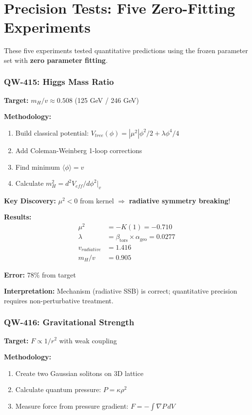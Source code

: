\documentclass[11pt,a4paper]{book}
\theoremstyle{remark}
\newcommand{\alphageo}{\alpha_{\text{geo}}}
\newcommand{\betators}{\beta_{\text{tors}}}
\begin{document}
\part{Precision Tests: Five Zero-Fitting Experiments}

These five experiments tested quantitative predictions using the frozen parameter set with \textbf{zero parameter fitting}.

\section{QW-415: Higgs Mass Ratio}

\textbf{Target:} $m_H/v \approx 0.508$ (125 GeV / 246 GeV)

\textbf{Methodology:}
\begin{enumerate}
    \item Build classical potential: $V_{tree}(\phi) = |\mu^2|\phi^2/2 + \lambda\phi^4/4$
    \item Add Coleman-Weinberg 1-loop corrections
    \item Find minimum $\langle\phi\rangle = v$
    \item Calculate $m_H^2 = d^2V_{eff}/d\phi^2|_v$
\end{enumerate}

\textbf{Key Discovery:} $\mu^2 < 0$ from kernel $\Rightarrow$ \textbf{radiative symmetry breaking}!

\textbf{Results:}
\begin{align}
\mu^2 &= -K(1) = -0.710 \\
\lambda &= \betators \times \alphageo = 0.0277 \\
v_{radiative} &= 1.416 \\
m_H/v &= \mathbf{0.905}
\end{align}

\textbf{Error:} 78\% from target

\textbf{Interpretation:} Mechanism (radiative SSB) is correct; quantitative precision requires non-perturbative treatment.

\section{QW-416: Gravitational Strength}

\textbf{Target:} $F \propto 1/r^2$ with weak coupling

\textbf{Methodology:}
\begin{enumerate}
    \item Create two Gaussian solitons on 3D lattice
    \item Calculate quantum pressure: $P = \kappa \rho^2$
    \item Measure force from pressure gradient: $F = -\int \nabla P \, dV$
\end{enumerate}
\end{document}
